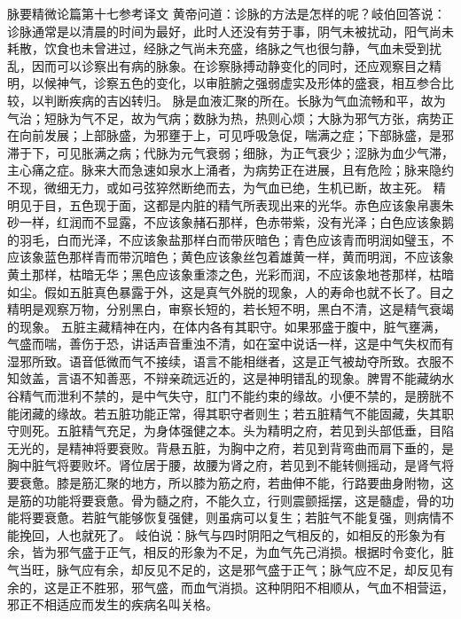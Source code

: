 \documentclass[a4paper,12pt,UTF8,twoside]{ctexbook}
\begin{document}
脉要精微论篇第十七参考译文
黄帝问道：诊脉的方法是怎样的呢？岐伯回答说：诊脉通常是以清晨的时间为最好，此时人还没有劳于事，阴气未被扰动，阳气尚未耗散，饮食也未曾进过，经脉之气尚未充盛，络脉之气也很匀静，气血未受到扰乱，因而可以诊察出有病的脉象。在诊察脉搏动静变化的同时，还应观察目之精明，以候神气，诊察五色的变化，以审脏腑之强弱虚实及形体的盛衰，相互参合比较，以判断疾病的吉凶转归。
脉是血液汇聚的所在。长脉为气血流畅和平，故为气治；短脉为气不足，故为气病；数脉为热，热则心烦；大脉为邪气方张，病势正在向前发展；上部脉盛，为邪壅于上，可见呼吸急促，喘满之症；下部脉盛，是邪滞于下，可见胀满之病；代脉为元气衰弱；细脉，为正气衰少；涩脉为血少气滞，主心痛之症。脉来大而急速如泉水上涌者，为病势正在进展，且有危险；脉来隐约不现，微细无力，或如弓弦猝然断绝而去，为气血已绝，生机已断，故主死。
精明见于目，五色现于面，这都是内脏的精气所表现出来的光华。赤色应该象帛裹朱砂一样，红润而不显露，不应该象赭石那样，色赤带紫，没有光泽；白色应该象鹅的羽毛，白而光泽，不应该象盐那样白而带灰暗色；青色应该青而明润如璧玉，不应该象蓝色那样青而带沉暗色；黄色应该象丝包着雄黄一样，黄而明润，不应该象黄土那样，枯暗无华；黑色应该象重漆之色，光彩而润，不应该象地苍那样，枯暗如尘。假如五脏真色暴露于外，这是真气外脱的现象，人的寿命也就不长了。目之精明是观察万物，分别黑白，审察长短的，若长短不明，黑白不清，这是精气衰竭的现象。
五脏主藏精神在内，在体内各有其职守。如果邪盛于腹中，脏气壅满，气盛而喘，善伤于恐，讲话声音重浊不清，如在室中说话一样，这是中气失权而有湿邪所致。语音低微而气不接续，语言不能相继者，这是正气被劫夺所致。衣服不知敛盖，言语不知善恶，不辩亲疏远近的，这是神明错乱的现象。脾胃不能藏纳水谷精气而泄利不禁的，是中气失守，肛门不能约束的缘故。小便不禁的，是膀胱不能闭藏的缘故。若五脏功能正常，得其职守者则生；若五脏精气不能固藏，失其职守则死。五脏精气充足，为身体强健之本。头为精明之府，若见到头部低垂，目陷无光的，是精神将要衰败。背悬五脏，为胸中之府，若见到背弯曲而肩下垂的，是胸中脏气将要败坏。肾位居于腰，故腰为肾之府，若见到不能转侧摇动，是肾气将要衰惫。膝是筋汇聚的地方，所以膝为筋之府，若曲伸不能，行路要曲身附物，这是筋的功能将要衰惫。骨为髓之府，不能久立，行则震颤摇摆，这是髓虚，骨的功能将要衰惫。若脏气能够恢复强健，则虽病可以复生；若脏气不能复强，则病情不能挽回，人也就死了。
岐伯说：脉气与四时阴阳之气相反的，如相反的形象为有余，皆为邪气盛于正气，相反的形象为不足，为血气先己消损。根据时令变化，脏气当旺，脉气应有余，却反见不足的，这是邪气盛于正气；脉气应不足，却反见有余的，这是正不胜邪，邪气盛，而血气消损。这种阴阳不相顺从，气血不相营运，邪正不相适应而发生的疾病名叫关格。
\end{document}
